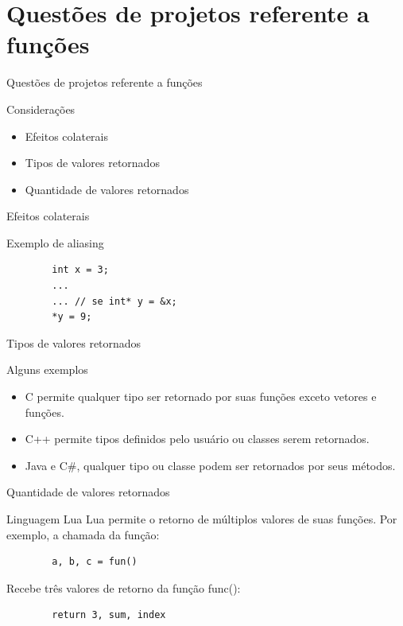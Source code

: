 \section{Questões de projetos referente a funções}
\begin{frame}{Questões de projetos referente a funções}
\begin{block}{Considerações}
	\begin{itemize}
	  \item Efeitos colaterais
	  \item Tipos de valores retornados
	  \item Quantidade de valores retornados
	\end{itemize}
\end{block}
\end{frame}

\begin{frame}[fragile]{Efeitos colaterais}
\begin{block}{Exemplo de aliasing}
	\begin{verbatim}
		int x = 3; 
		... 
		... // se int* y = &x;
		*y = 9;
	\end{verbatim}
\end{block}
\end{frame}

\begin{frame}{Tipos de valores retornados}
\begin{block}{Alguns exemplos}
	\begin{itemize}
		\item C permite qualquer tipo ser retornado por suas funções exceto vetores e funções. 
		\item C++ permite tipos definidos pelo usuário ou classes serem retornados. 
		\item Java e C\#, qualquer tipo ou classe podem ser retornados por seus métodos.
	\end{itemize}
\end{block}
\end{frame}

\begin{frame}[fragile]{Quantidade de valores retornados}
\begin{block}{Linguagem Lua}
	Lua permite o retorno de múltiplos valores de suas funções. Por exemplo, a chamada da função:
	\begin{verbatim}
		a, b, c = fun() 
	\end{verbatim}
	Recebe três valores de retorno da função func():  
	\begin{verbatim}
		return 3, sum, index
	\end{verbatim}
\end{block}
\end{frame}

